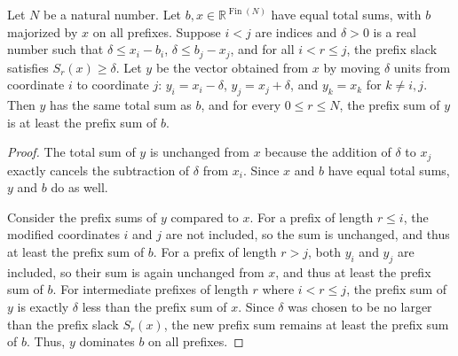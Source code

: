\begin{helper}
Let \(N\) be a natural number. Let \(b, x \in \mathbb R^{\operatorname{Fin}(N)}\) have equal total sums, with \(b\) majorized by \(x\) on all prefixes. Suppose \(i < j\) are indices and \(\delta > 0\) is a real number such that \(\delta \le x_i - b_i\), \(\delta \le b_j - x_j\), and for all \(i < r \le j\), the prefix slack satisfies \(S_r(x) \ge \delta\). Let \(y\) be the vector obtained from \(x\) by moving \(\delta\) units from coordinate \(i\) to coordinate \(j\): \(y_i = x_i - \delta\), \(y_j = x_j + \delta\), and \(y_k = x_k\) for \(k \neq i, j\). Then \(y\) has the same total sum as \(b\), and for every \(0 \le r \le N\), the prefix sum of \(y\) is at least the prefix sum of \(b\).
\end{helper}
\begin{proof}
The total sum of \(y\) is unchanged from \(x\) because the addition of \(\delta\) to \(x_j\) exactly cancels the subtraction of \(\delta\) from \(x_i\). Since \(x\) and \(b\) have equal total sums, \(y\) and \(b\) do as well.

Consider the prefix sums of \(y\) compared to \(x\). For a prefix of length \(r \le i\), the modified coordinates \(i\) and \(j\) are not included, so the sum is unchanged, and thus at least the prefix sum of \(b\). For a prefix of length \(r > j\), both \(y_i\) and \(y_j\) are included, so their sum is again unchanged from \(x\), and thus at least the prefix sum of \(b\). For intermediate prefixes of length \(r\) where \(i < r \le j\), the prefix sum of \(y\) is exactly \(\delta\) less than the prefix sum of \(x\). Since \(\delta\) was chosen to be no larger than the prefix slack \(S_r(x)\), the new prefix sum remains at least the prefix sum of \(b\). Thus, \(y\) dominates \(b\) on all prefixes.
\end{proof}
